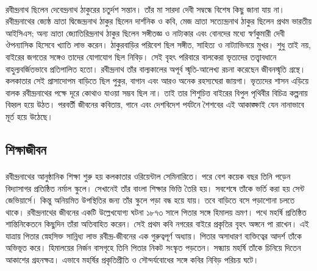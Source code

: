 \documentclass{article}
\begin{document}
\paragraph{}
রবীন্দ্রনাথ ছিলেন দেবেন্দ্রনাথ ঠাকুরের চতুর্দশ সন্তান। তাঁর মা সারদা দেবী সম্বন্ধে বিশেষ কিছু জানা যায় না। রবীন্দ্রনাথের জ্যেষ্ঠ ভ্রাতা দ্বিজেন্দ্রনাথ ঠাকুর ছিলেন দার্শনিক ও কবি, মেজ ভ্রাতা সত্যেন্দ্রনাথ ঠাকুর ছিলেন প্রথম ভারতীয় আইসিএস; অন্য ভ্রাতা জ্যোতিরিন্দ্রনাথ ঠাকুর ছিলেন সঙ্গীতজ্ঞ ও নাট্যকার এবং বোনদের মধ্যে স্বর্ণকুমারী দেবী ঔপন্যাসিক হিসেবে খ্যাতি লাভ করেন। ঠাকুরবাড়ির পরিবেশ ছিল সঙ্গীত, সাহিত্য ও নাট্যাভিনয়ে মুখর। শুধু তাই নয়, বাইরের জগতের সঙ্গেও তাদের যোগাযোগ ছিল নিবিড়। সেই বৃহৎ পরিবারে বালকেরা ভৃত্যদের তত্ত্বাবধানে বাহুল্যবর্জিতভাবে প্রতিপালিত হতো। রবীন্দ্রনাথ তাঁর বাল্যকালের অপূর্ব স্মৃতি-আলেখ্য রচনা করেছেন জীবনস্মৃতি গ্রন্থে। কলকাতার সেই প্রাসাদোপম বাড়িতে ছিল পুকুর, বাগান এবং আরও অনেক রহস্যঘেরা জায়গা। ভৃত্যদের শাসন এড়িয়ে বালক রবীন্দ্রনাথের পক্ষে দূরে কোথাও যাওয়া সম্ভব ছিল না। তাই তার শিশুচিত্ত বাইরের বিপুল পৃথিবীর বিচিত্র কল্পনায় বিহ্বল হয়ে উঠত। পরবর্তী জীবনের কবিতায়, গানে এবং দেশবিদেশ পর্যটনে শৈশবের এই আকাঙ্ক্ষাই যেন নানাভাবে মূর্ত হয়ে উঠেছে।

\subsection{শিক্ষাজীবন}
\paragraph{}
রবীন্দ্রনাথের আনুষ্ঠানিক শিক্ষা শুরু হয় কলকাতার ওরিয়েন্টাল সেমিনারিতে। পরে বেশ কয়েক বছর তিনি পড়েন বিদ্যাসাগর প্রতিষ্ঠিত নর্মাল স্কুলে। সেখানেই তাঁর বাংলা শিক্ষার ভিত্তি তৈরি হয়। সবশেষে তাঁকে ভর্তি করা হয় সেন্ট জেভিয়ার্সে। কিন্তু অনিয়মিত উপস্থিতির জন্য তাঁর স্কুলে পড়া বন্ধ হয়ে যায়। তবে বাড়িতে বসে পড়াশোনা চলতে থাকে। রবীন্দ্রনাথের জীবনের একটি উল্লেখযোগ্য ঘটনা ১৮৭৩ সালে পিতার সঙ্গে হিমালয় ভ্রমণ। পথে মহর্ষি প্রতিষ্ঠিত শান্তিনিকেতনে কিছুদিন তাঁরা অতিবাহিত করেন। সেই প্রথম কবি নগরের বাইরে প্রকৃতির বৃহৎ অঙ্গনে পা রাখেন। এই যাত্রায় পিতার স্নেহসিক্ত সান্নিধ্য লাভ রবীন্দ্র-জীবনের এক গুরুত্বপূর্ণ অধ্যায়। পিতার অসাধারণ ব্যক্তিত্বের আদর্শ তাঁকে অভিভূত করে। হিমালয়ের নির্জন বাসগৃহে তিনি পিতার নিকট সংস্কৃত পড়তেন। সন্ধ্যায় মহর্ষি তাঁকে চিনিয়ে দিতেন আকাশের গ্রহনক্ষত্র। এভাবে মহর্ষির প্রকৃতিপ্রীতি ও সৌন্দর্যবোধের সঙ্গে কবির নিবিড় পরিচয় ঘটে।
\end{document}
